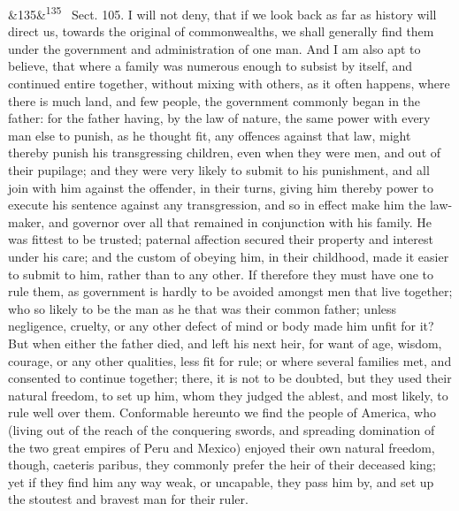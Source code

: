 \documentclass[12pt]{article}
\newcommand{\para}[1][]{\par\noindent\ifx&#1&\else\textsuperscript{\footnotesize #1}~\fi}
\begin{document}
\para[135] Sect. 105. I will not deny, that if we look back as far as history will direct us, towards the original of commonwealths, we shall generally find them under the government and administration of one man. And I am also apt to believe, that where a family was numerous enough to subsist by itself, and continued entire together, without mixing with others, as it often happens, where there is much land, and few people, the government commonly began in the father: for the father having, by the law of nature, the same power with every man else to punish, as he thought fit, any offences against that law, might thereby punish his transgressing children, even when they were men, and out of their pupilage; and they were very likely to submit to his punishment, and all join with him against the offender, in their turns, giving him thereby power to execute his sentence against any transgression, and so in effect make him the law-maker, and governor over all that remained in conjunction with his family. He was fittest to be trusted; paternal affection secured their property and interest under his care; and the custom of obeying him, in their childhood, made it easier to submit to him, rather than to any other. If therefore they must have one to rule them, as government is hardly to be avoided amongst men that live together; who so likely to be the man as he that was their common father; unless negligence, cruelty, or any other defect of mind or body made him unfit for it? But when either the father died, and left his next heir, for want of age, wisdom, courage, or any other qualities, less fit for rule; or where several families met, and consented to continue together; there, it is not to be doubted, but they used their natural freedom, to set up him, whom they judged the ablest, and most likely, to rule well over them. Conformable hereunto we find the people of America, who (living out of the reach of the conquering swords, and spreading domination of the two great empires of Peru and Mexico) enjoyed their own natural freedom, though, caeteris paribus, they commonly prefer the heir of their deceased king; yet if they find him any way weak, or uncapable, they pass him by, and set up the stoutest and bravest man for their ruler.
\end{document}

